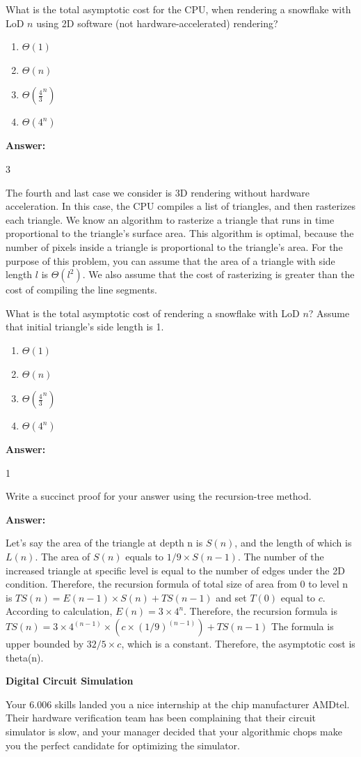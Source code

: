 \documentclass[12pt,twoside]{article}
\newcommand{\answer}{
 \par\medskip
 \textbf{Answer:}
}
\newcommand{\answerIs}{ \answer
3
}
\newcommand{\answerIt}{ \answer
1
}
\newcommand{\answerIu}{ \answer
Let's say the area of the triangle at depth n is $S(n)$, 
and the length of which is $L(n)$. The area of $S(n)$ equals
to $1/9 \times S(n - 1)$. The number of the increased triangle at 
specific level is equal to the number of edges under the 2D condition.
Therefore, the recursion formula of total size of area from 0 to 
level n is $TS(n) = E(n - 1) \times S(n) + TS(n - 1)$ and set $T(0)$
equal to $c$. According to calculation, $E(n) = 3 \times 4 ^ n$.
Therefore, the recursion formula is 
$TS(n) = 3 \times 4 ^ (n - 1) \times (c \times (1/9) ^ (n - 1)) + TS(n - 1)$
The formula is upper bounded by $32/5 \times c$, which is a constant.
Therefore, the asymptotic cost is theta(n).
}
\begin{document}
\begin{problems}
\begin{problemparts}
  \problempart {} What is the total asymptotic cost for the CPU, when rendering
  a snowflake with LoD $n$ using 2D software (not hardware-accelerated)
  rendering?
   \begin{enumerate}
      \item $\Theta(1)$
      \item $\Theta(n)$
      \item $\Theta(\frac{4}{3}^n)$
      \item $\Theta(4^n)$
    \end{enumerate}
\answerIs

\end{problemparts}

The fourth and last case we consider is 3D rendering without hardware
acceleration. In this case, the CPU compiles a list of triangles, and then
rasterizes each triangle. We know an algorithm to rasterize a triangle that
runs in time proportional to the triangle's surface area. This algorithm is
optimal, because the number of pixels inside a triangle is proportional to the
triangle's area. For the purpose of this problem, you can assume that the area
of a triangle with side length $l$ is $\Theta(l^2)$. We also assume that the
cost of rasterizing is greater than the cost of compiling the line segments.

\begin{problemparts}
  \problempart {} What is the total asymptotic cost of rendering a snowflake
  with LoD $n$? Assume that initial triangle's side length is 1.
    \begin{enumerate}
      \item $\Theta(1)$
      \item $\Theta(n)$
      \item $\Theta(\frac{4}{3}^n)$
      \item $\Theta(4^n)$
    \end{enumerate}
\answerIt
    
  \problempart {} Write a succinct proof for your answer using the  
  recursion-tree method.
  \answerIu
\end{problemparts}



\problem {} \textbf{Digital Circuit Simulation}

Your 6.006 skills landed you a nice internship at the chip manufacturer AMDtel.
Their hardware verification team has been complaining that their circuit
simulator is slow, and your manager decided that your algorithmic chops make
you the perfect candidate for optimizing the simulator.


\end{problems}
\end{document}
